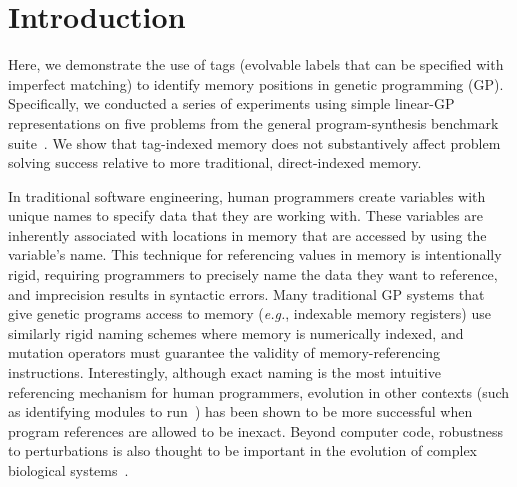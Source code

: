 \section{Introduction}

Here, we demonstrate the use of tags (evolvable labels that can be specified with imperfect matching) to identify memory positions in genetic programming (GP).
Specifically, we conducted a series of experiments using simple linear-GP representations on five problems from the general program-synthesis benchmark suite~\citep{helmuth_general_2015}.  
We show that tag-indexed memory does not substantively affect problem solving success relative to more traditional, direct-indexed memory.

In traditional software engineering, human programmers create variables with unique names to specify data that they are working with.  
These variables are inherently associated with locations in memory that are accessed by using the variable's name.
This technique for referencing values in memory is intentionally rigid, requiring programmers to precisely name the data they want to reference, and imprecision results in syntactic errors.
Many traditional GP systems that give genetic programs access to memory (\textit{e.g.}, indexable memory registers) use similarly rigid naming schemes where memory is numerically indexed, and mutation operators must guarantee the validity of memory-referencing instructions. 
Interestingly, although exact naming is the most intuitive referencing mechanism
for human programmers, evolution in other contexts (such as identifying modules to run~\citep{lalejini_what_2019}) has been shown to be more successful when program references are allowed to be inexact.
Beyond computer code, robustness to perturbations is also thought to be important in the evolution of complex biological systems~\citep{kitano_biological_2004}.



